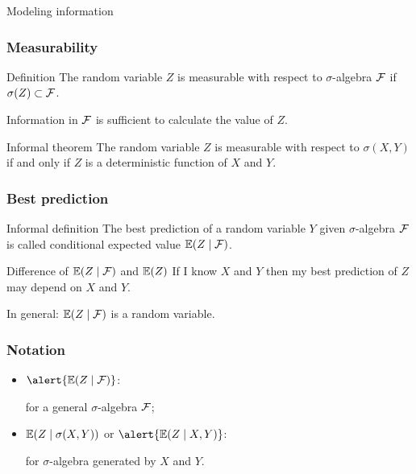 \begin{frame}{Modeling information}
    


    
\end{frame}



\begin{frame}
    \frametitle{Measurability}

    \pause
    \begin{block}{Definition \formalduck}
        The random variable $Z$ is measurable with respect to $\sigma$-algebra $\mathcal{F}$ if 
        $\sigma(Z) \subset \mathcal{F}$. 
    \end{block}
    \pause
    Information in $\mathcal{F}$ is sufficient to calculate the value of $Z$.
    \pause
    \begin{block}{Informal theorem \informalduck}
        The random variable $Z$ is measurable with respect to $\sigma(X, Y)$ if and only if
        $Z$ is a deterministic function of $X$ and $Y$.  
    \end{block}
\end{frame}


\begin{frame}
    \frametitle{Best prediction}

    \begin{block}{Informal definition \informalduck}
        The \alert{best prediction} of a random variable $Y$ given $\sigma$-algebra $\mathcal{F}$ is called 
        \alert{conditional expected value} $\mathbb{E}(Z \mid \mathcal{F})$.
    \end{block}

    \pause 
    \begin{block}{Difference of $\mathbb{E}(Z \mid \mathcal{F})$ and $\mathbb{E}(Z)$}
    If I know $X$ and $Y$ then my best prediction of $Z$ may depend on $X$ and $Y$.

    In general: $\mathbb{E}(Z \mid \mathcal{F})$ is a \alert{random variable}.
    \end{block}
\end{frame}


\begin{frame}
    \frametitle{Notation}

    \begin{itemize}[<+->]
        \item $\alert{\E(Z \mid \cF)}$: 
        
        for a general $\sigma$-algebra $\mathcal{F}$;
        \item $\mathbb{E}(Z \mid \sigma(X, Y))$ or $\alert{\E(Z \mid X, Y)}$: 
        
        for $\sigma$-algebra generated by $X$ and $Y$.
    \end{itemize}
\end{frame}

